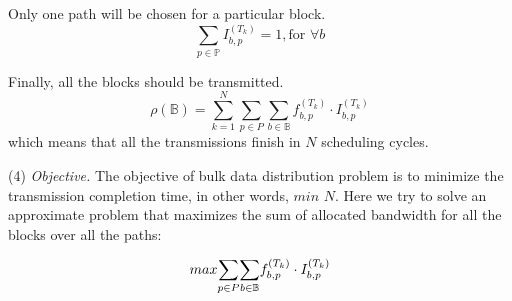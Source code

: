 \begin{packeditemize}
\item Only one path will be chosen for a particular block.
\begin{equation}
\displaystyle{\sum_{p \in \mathbb{P}}} I^{(T_k)}_{b,p} = 1, \text{for }\forall b
\end{equation}

\item Finally, all the blocks should be transmitted.
\begin{equation}
\rho (\mathbb{B}) = \displaystyle{\sum_{k=1}^{N}} \displaystyle{\sum_{p\in P}} \displaystyle{\sum_{b\in \mathbb{B}}} f_{b,p}^{(T_k)} \cdot I_{b,p}^{(T_k)}
\end{equation}
which means that all the transmissions finish in $N$ scheduling cycles.
\end{packeditemize}


\noindent(4) {\em Objective.} The objective of bulk data distribution problem is to minimize the transmission completion time, in other words, $min$ $N$. Here we try to solve an approximate problem that maximizes the sum of allocated bandwidth for all the blocks over all the paths:

\begin{equation}
\centering
max \displaystyle{\sum_{p\in P}} \displaystyle{\sum_{b\in \mathbb{B}}} f_{b,p}^{(T_k)} \cdot I_{b,p}^{(T_k)}
\label{equation:objective}
\end{equation}




